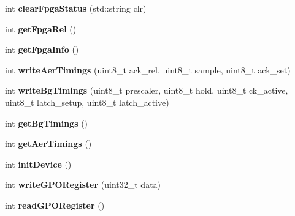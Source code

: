 \begin{DoxyCompactItemize}
\item 
\hypertarget{classvsctrlDevManager_a34310dcff72b9c9f4f2a80fb7ab25a0a}{int {\bfseries clear\-Fpga\-Status} (std\-::string clr)}\label{classvsctrlDevManager_a34310dcff72b9c9f4f2a80fb7ab25a0a}

\item 
\hypertarget{classvsctrlDevManager_a55353e0f83e3b3020ea151ddd8e7f14f}{int {\bfseries get\-Fpga\-Rel} ()}\label{classvsctrlDevManager_a55353e0f83e3b3020ea151ddd8e7f14f}

\item 
\hypertarget{classvsctrlDevManager_a1718274a8e09640d01a6e1c30b81dea3}{int {\bfseries get\-Fpga\-Info} ()}\label{classvsctrlDevManager_a1718274a8e09640d01a6e1c30b81dea3}

\item 
\hypertarget{classvsctrlDevManager_a09e8586d71ef063d025a37a1a6977310}{int {\bfseries write\-Aer\-Timings} (uint8\-\_\-t ack\-\_\-rel, uint8\-\_\-t sample, uint8\-\_\-t ack\-\_\-set)}\label{classvsctrlDevManager_a09e8586d71ef063d025a37a1a6977310}

\item 
\hypertarget{classvsctrlDevManager_aed1443c969692cd042d87997a59a2479}{int {\bfseries write\-Bg\-Timings} (uint8\-\_\-t prescaler, uint8\-\_\-t hold, uint8\-\_\-t ck\-\_\-active, uint8\-\_\-t latch\-\_\-setup, uint8\-\_\-t latch\-\_\-active)}\label{classvsctrlDevManager_aed1443c969692cd042d87997a59a2479}

\item 
\hypertarget{classvsctrlDevManager_a821576ea67f67432d584c19abd20005c}{int {\bfseries get\-Bg\-Timings} ()}\label{classvsctrlDevManager_a821576ea67f67432d584c19abd20005c}

\item 
\hypertarget{classvsctrlDevManager_aa898c4407bfe7e1f53ea04c45ca2ebd5}{int {\bfseries get\-Aer\-Timings} ()}\label{classvsctrlDevManager_aa898c4407bfe7e1f53ea04c45ca2ebd5}

\item 
\hypertarget{classvsctrlDevManager_a3c77d4aec1d1a05c4295a97372af4149}{int {\bfseries init\-Device} ()}\label{classvsctrlDevManager_a3c77d4aec1d1a05c4295a97372af4149}

\item 
\hypertarget{classvsctrlDevManager_aef5104292baec220c7a70ffdc7e2c016}{int {\bfseries write\-G\-P\-O\-Register} (uint32\-\_\-t data)}\label{classvsctrlDevManager_aef5104292baec220c7a70ffdc7e2c016}

\item 
\hypertarget{classvsctrlDevManager_a9e71984e46f46b72e43e08329cdbca94}{int {\bfseries read\-G\-P\-O\-Register} ()}\label{classvsctrlDevManager_a9e71984e46f46b72e43e08329cdbca94}


\end{DoxyCompactItemize}
